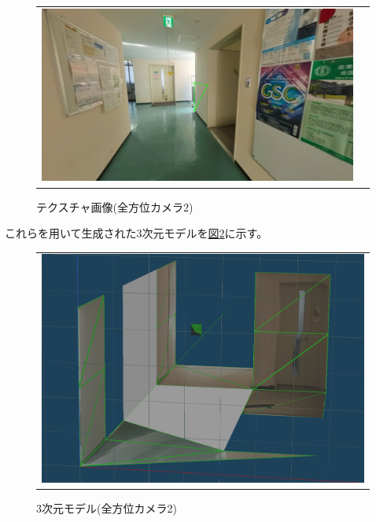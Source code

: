 \documentclass[]{jarticle}          %
\begin{document}
\begin{figure}[H]
\begin{center}
\begin{tabular}{cc}
      \includegraphics[keepaspectratio, scale=0.08]{figures/texture1/texture_1_15.png}\\
    \end{tabular}
  \end{center}
  \caption{テクスチャ画像(全方位カメラ2)}
  \label{four}
\end{figure}

これらを用いて生成された3次元モデルを\hyperref[five]{図\ref{five}}に示す。

\begin{figure}[H]
  \begin{center}
    \begin{tabular}{c}
      \includegraphics[keepaspectratio, scale=0.4]{figures/3dmodel1.png}
    \end{tabular}
  \end{center}
  \caption{3次元モデル(全方位カメラ2)}
  \label{five}
\end{figure}
\end{document}
